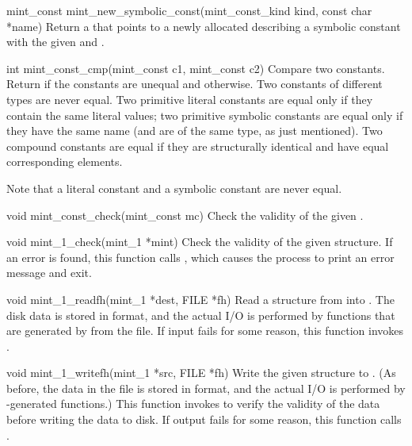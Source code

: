 \begin{cprototypelist}
\begin{cprototypelist}
    \item[mint_const mint_new_symbolic_const(mint_const_kind kind,
                                             const char *name)]
    Return a  that points to a newly allocated
     describing a symbolic constant with the given
     and .
  \end{cprototypelist}

  \item[int mint_const_cmp(mint_const c1, mint_const c2)]
  Compare two \MINT{} constants.  Return  if the constants are
  unequal and  otherwise.  Two constants of different types are
  never equal.  Two primitive literal constants are equal only if they contain
  the same literal values; two primitive symbolic constants are equal only if
  they have the same name (and are of the same type, as just mentioned).  Two
  compound constants are equal if they are structurally identical and have
  equal corresponding elements.

  Note that a literal constant and a symbolic constant are never equal.

  \item[void mint_const_check(mint_const mc)]
  Check the validity of the given .


  \item[void mint_1_check(mint_1 *mint)]
  Check the validity of the given  structure.  If an error is
  found, this function calls , which causes the process to
  print an error message and exit.

  \item[void mint_1_readfh(mint_1 *dest, FILE *fh)]
  Read a  structure from  into
  .  The disk data is stored in \XDR{} format, and the actual
  I/O is performed by functions that are generated by \rpcgen{} from the
   file.  If input fails for some reason, this function
  invokes .

  \item[void mint_1_writefh(mint_1 *src, FILE *fh)]
  Write the given  structure to .  (As before,
  the data in the file is stored in \XDR{} format, and the actual I/O is
  performed by \rpcgen{}-generated functions.)  This function invokes
   to verify the validity of the \MINT{} data before
  writing the data to disk.  If output fails for some reason, this function
  calls .
\end{cprototypelist}

